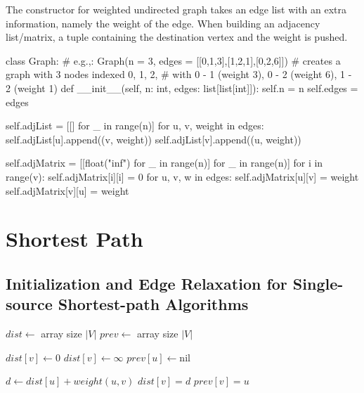 
The constructor for weighted undirected graph takes an edge list with an extra information, namely the weight of the edge.
When building an adjacency list/matrix, a tuple containing the destination vertex and the weight is pushed.

\begin{python}
class Graph:
    # e.g.,: Graph(n = 3, edges = [[0,1,3],[1,2,1],[0,2,6]])
    # creates a graph with 3 nodes indexed 0, 1, 2,
    # with 0 - 1 (weight 3), 0 - 2 (weight 6), 1 - 2 (weight 1)
    def __init__(self, n: int, edges: list[list[int]]):
        self.n = n
        self.edges = edges

        self.adjList = [[] for _ in range(n)]
        for u, v, weight in edges:
            self.adjList[u].append((v, weight))
            self.adjList[v].append((u, weight))

        self.adjMatrix = [[float("inf") for _ in range(n)] for _ in range(n)]
        for i in range(v):
            self.adjMatrix[i][i] = 0
        for u, v, w in edges:
            self.adjMatrix[u][v] = weight
            self.adjMatrix[v][u] = weight
\end{python}

\section{Shortest Path}

\subsection{Initialization and Edge Relaxation for Single-source Shortest-path Algorithms}

\noindent \hrulefill
\begin{algorithmic}[1]
   
    \State $dist \gets$ array size $|V|$
    \State $prev \gets$ array size $|V|$

        $dist[v] \gets 0$
      \EndIf
        $dist[v] \gets \infty$
      \EndIf
      \State $prev[u] \gets \text{nil}$ 
    \EndFor
  \EndFunction
\end{algorithmic}
\noindent \hrulefill

\noindent \hrulefill
\begin{algorithmic}[1]
    \State $d \gets dist[u] + weight(u, v)$
      \State $dist[v] = d$
      \State $prev[v] = u$
    \EndIf
  \EndFunction
\end{algorithmic}
\noindent \hrulefill

